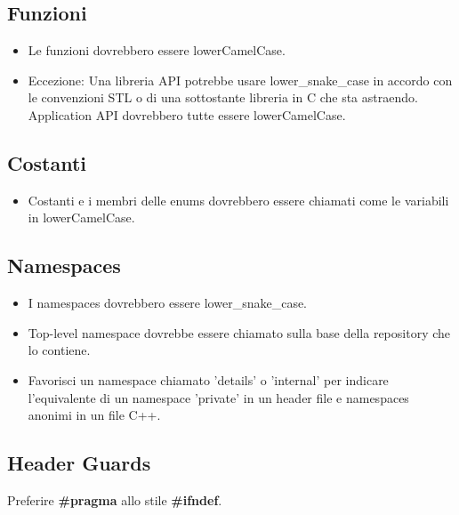 \subsection{Funzioni}

\begin{itemize}
	\item \textsf{\small Le funzioni dovrebbero essere lowerCamelCase.}
	\item \textsf{\small Eccezione: Una libreria API potrebbe usare lower\_snake\_case in accordo con le convenzioni STL o di una sottostante libreria in C che sta astraendo. Application API dovrebbero tutte essere lowerCamelCase.}
\end{itemize}

\subsection{Costanti}

\begin{itemize}
	\item \textsf{\small Costanti e i membri delle enums dovrebbero essere chiamati come le variabili in lowerCamelCase.}
\end{itemize}

\subsection{Namespaces}

\begin{itemize}
	\item \textsf{\small I namespaces dovrebbero essere lower\_snake\_case.}
	\item \textsf{\small Top-level namespace dovrebbe essere chiamato sulla base della repository che lo contiene.}
	\item \textsf{\small Favorisci un namespace chiamato 'details' o 'internal' per indicare l'equivalente di un namespace 'private' in un header file e namespaces anonimi in un file C++.}
\end{itemize}

\subsection{Header Guards}

\textsf{\small Preferire \textbf{\#pragma} allo stile \textbf{\#ifndef}.}\\

